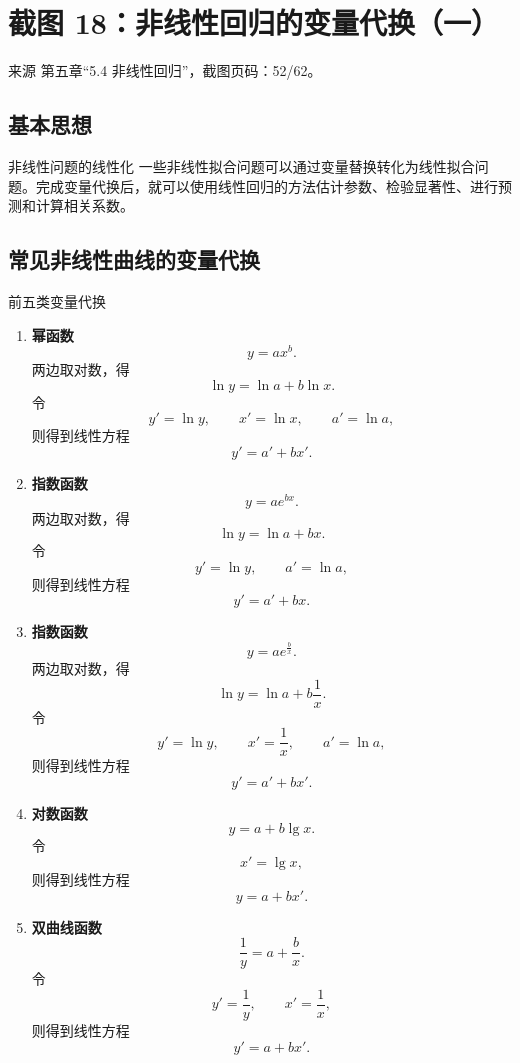 \documentclass[UTF8,zihao=-4,fontset=fandol]{ctexart}
\begin{document}
\section{截图 18：非线性回归的变量代换（一）}

\begin{sourcebox}{来源}
第五章“5.4 非线性回归”，截图页码：52/62。
\end{sourcebox}

\subsection{基本思想}

\begin{keybox}{非线性问题的线性化}
一些非线性拟合问题可以通过变量替换转化为线性拟合问题。完成变量代换后，就可以使用线性回归的方法估计参数、检验显著性、进行预测和计算相关系数。
\end{keybox}

\subsection{常见非线性曲线的变量代换}

\begin{methodbox}{前五类变量代换}
\begin{enumerate}[label=(\arabic*),leftmargin=2.4em]
  \item \textbf{幂函数}
  \[
  y=ax^b.
  \]
  两边取对数，得
  \[
  \ln y=\ln a+b\ln x.
  \]
  令
  \[
  y'=\ln y,\qquad x'=\ln x,\qquad a'=\ln a,
  \]
  则得到线性方程
  \[
  y'=a'+bx'.
  \]

  \item \textbf{指数函数}
  \[
  y=ae^{bx}.
  \]
  两边取对数，得
  \[
  \ln y=\ln a+bx.
  \]
  令
  \[
  y'=\ln y,\qquad a'=\ln a,
  \]
  则得到线性方程
  \[
  y'=a'+bx.
  \]

  \item \textbf{指数函数}
  \[
  y=ae^{\frac{b}{x}}.
  \]
  两边取对数，得
  \[
  \ln y=\ln a+b\frac{1}{x}.
  \]
  令
  \[
  y'=\ln y,\qquad x'=\frac{1}{x},\qquad a'=\ln a,
  \]
  则得到线性方程
  \[
  y'=a'+bx'.
  \]

  \item \textbf{对数函数}
  \[
  y=a+b\lg x.
  \]
  令
  \[
  x'=\lg x,
  \]
  则得到线性方程
  \[
  y=a+bx'.
  \]

  \item \textbf{双曲线函数}
  \[
  \frac{1}{y}=a+\frac{b}{x}.
  \]
  令
  \[
  y'=\frac{1}{y},\qquad x'=\frac{1}{x},
  \]
  则得到线性方程
  \[
  y'=a+bx'.
  \]
\end{enumerate}
\end{methodbox}
\end{document}
